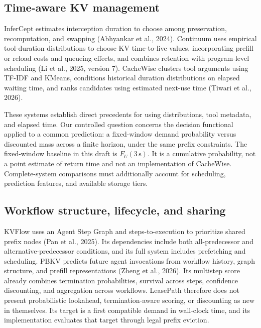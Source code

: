 \documentclass[sigconf, screen, review]{acmart}
\begin{document}
\subsection{Time-aware KV
management}\label{time-aware-kv-management}

InferCept estimates interception duration to choose among preservation,
recomputation, and swapping (Abhyankar et al., 2024). Continuum uses
empirical tool-duration distributions to choose KV time-to-live values,
incorporating prefill or reload costs and queueing effects, and combines
retention with program-level scheduling (Li et al., 2025, version 7).
CacheWise clusters tool arguments using TF-IDF and KMeans, conditions
historical duration distributions on elapsed waiting time, and ranks
candidates using estimated next-use time (Tiwari et al., 2026).

These systems establish direct precedents for using distributions, tool
metadata, and elapsed time. Our controlled question concerns the
decision functional applied to a common prediction: a fixed-window
demand probability versus discounted mass across a finite horizon, under
the same prefix constraints. The fixed-window baseline in this draft is
\(F_U(3\,\mathrm{s})\). It is a cumulative probability, not a point
estimate of return time and not an implementation of CacheWise.
Complete-system comparisons must additionally account for scheduling,
prediction features, and available storage tiers.

\subsection{Workflow structure, lifecycle, and
sharing}\label{workflow-structure-lifecycle-and-sharing}

KVFlow uses an Agent Step Graph and steps-to-execution to prioritize
shared prefix nodes (Pan et al., 2025). Its dependencies include both
all-predecessor and alternative-predecessor conditions, and its full
system includes prefetching and scheduling. PBKV predicts future agent
invocations from workflow history, graph structure, and prefill
representations (Zheng et al., 2026). Its multistep score already
combines termination probabilities, survival across steps, confidence
discounting, and aggregation across workflows. LeasePath therefore does
not present probabilistic lookahead, termination-aware scoring, or
discounting as new in themselves. Its target is a first compatible
demand in wall-clock time, and its implementation evaluates that target
through legal prefix eviction.
\end{document}
